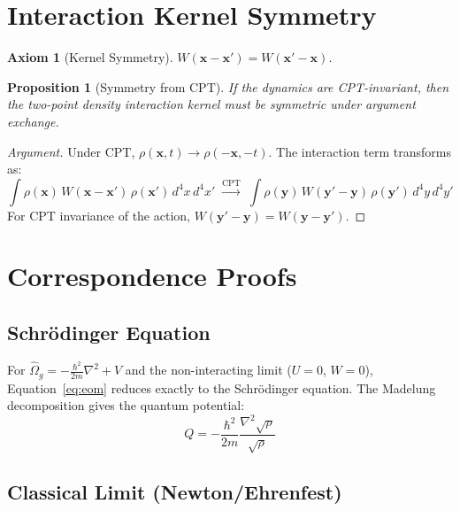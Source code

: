 \documentclass[11pt, a4paper]{article}
\newtheorem{axiom}{Axiom}[section]
\newtheorem{proposition}{Proposition}[section]
\begin{document}
\section{Interaction Kernel Symmetry}

\begin{axiom}[Kernel Symmetry]
$W(\mathbf{x}-\mathbf{x}') = W(\mathbf{x}'-\mathbf{x})$.
\end{axiom}

\begin{proposition}[Symmetry from CPT]
If the dynamics are CPT-invariant, then the two-point density
interaction kernel must be symmetric under argument exchange.
\end{proposition}

\begin{proof}[Argument]
Under CPT, $\rho(\mathbf{x},t) \to \rho(-\mathbf{x},-t)$. The
interaction term transforms as:
\[
  \int \rho(\mathbf{x})\, W(\mathbf{x}-\mathbf{x}')\,
  \rho(\mathbf{x}')\, d^4x\, d^4x'
  \;\xrightarrow{\text{CPT}}\;
  \int \rho(\mathbf{y})\, W(\mathbf{y}'-\mathbf{y})\,
  \rho(\mathbf{y}')\, d^4y\, d^4y'
\]
For CPT invariance of the action,
$W(\mathbf{y}'-\mathbf{y}) = W(\mathbf{y}-\mathbf{y}')$.
\end{proof}

\section{Correspondence Proofs}

\subsection{Schr\"odinger Equation}

For $\hat{\Omega}_g = -\frac{\hbar^2}{2m}\nabla^2 + V$ and the
non-interacting limit ($U = 0$, $W = 0$), Equation~\ref{eq:eom}
reduces exactly to the Schr\"odinger equation. The Madelung
decomposition gives the quantum potential:
\begin{equation}
  Q = -\frac{\hbar^2}{2m}\frac{\nabla^2\sqrt{\rho}}{\sqrt{\rho}}
\end{equation}

\subsection{Classical Limit (Newton/Ehrenfest)}
\end{document}
